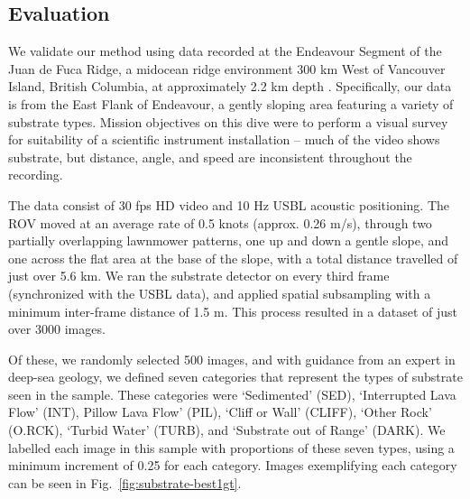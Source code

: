 \subsection{Evaluation}

We validate our method using data recorded at the Endeavour Segment of the Juan de Fuca Ridge, a midocean
ridge environment 300 km West of Vancouver Island, British Columbia, at approximately 2.2 km depth \citep{endeavourMPAPlan}. Specifically, our data is from the East Flank of Endeavour, a gently sloping area featuring a variety of substrate types. Mission objectives on this dive were to perform a visual survey for suitability of a scientific instrument installation -- much of the video shows substrate, but distance, angle, and speed are inconsistent throughout the recording.

The data consist of 30 fps HD video and 10 Hz USBL acoustic positioning. The ROV moved at an average rate of 0.5 knots (approx. 0.26 m/s), through two partially overlapping lawnmower patterns, one up and down a gentle slope, and one across the flat area at the base of the slope, with a total distance travelled of just over 5.6 km. We ran the substrate detector on every third frame (synchronized with the USBL data), and applied spatial subsampling with a minimum inter-frame distance of 1.5 m. This process resulted in a dataset of just over 3000 images.

Of these, we randomly selected 500 images, and with guidance from an expert in deep-sea geology, we defined seven categories that represent the types of substrate seen in the sample. These categories were ‘Sedimented’ (SED), ‘Interrupted Lava Flow’ (INT), Pillow Lava Flow’ (PIL), ‘Cliff or Wall’ (CLIFF), ‘Other Rock’ (O.RCK), ‘Turbid Water’ (TURB), and ‘Substrate out of Range’ (DARK). We labelled each image in this sample with proportions of these seven types, using a minimum increment of 0.25 for each category. Images exemplifying each category can be seen in Fig.~\ref{fig:substrate-best1gt}.

